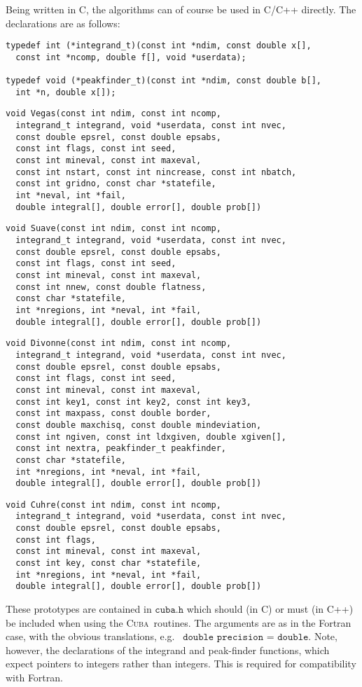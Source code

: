 \documentclass[12pt]{article}
\newcommand\cuba{\textsc{Cuba}}
\newcommand\eg{e.g.\ }
\newcommand\Code[1]{\ensuremath{\texttt{#1}}}
\begin{document}
Being written in C, the algorithms can of course be used in C/C++ 
directly.  The declarations are as follows:
\begin{verbatim}
typedef int (*integrand_t)(const int *ndim, const double x[],
  const int *ncomp, double f[], void *userdata);

typedef void (*peakfinder_t)(const int *ndim, const double b[],
  int *n, double x[]);
\end{verbatim}
\begin{verbatim}
void Vegas(const int ndim, const int ncomp,
  integrand_t integrand, void *userdata, const int nvec,
  const double epsrel, const double epsabs,
  const int flags, const int seed,
  const int mineval, const int maxeval,
  const int nstart, const int nincrease, const int nbatch,
  const int gridno, const char *statefile,
  int *neval, int *fail,
  double integral[], double error[], double prob[])
\end{verbatim}
\begin{verbatim}
void Suave(const int ndim, const int ncomp,
  integrand_t integrand, void *userdata, const int nvec,
  const double epsrel, const double epsabs,
  const int flags, const int seed,
  const int mineval, const int maxeval,
  const int nnew, const double flatness,
  const char *statefile,
  int *nregions, int *neval, int *fail,
  double integral[], double error[], double prob[])
\end{verbatim}
\begin{verbatim}
void Divonne(const int ndim, const int ncomp,
  integrand_t integrand, void *userdata, const int nvec,
  const double epsrel, const double epsabs,
  const int flags, const int seed,
  const int mineval, const int maxeval,
  const int key1, const int key2, const int key3,
  const int maxpass, const double border,
  const double maxchisq, const double mindeviation,
  const int ngiven, const int ldxgiven, double xgiven[],
  const int nextra, peakfinder_t peakfinder,
  const char *statefile,
  int *nregions, int *neval, int *fail,
  double integral[], double error[], double prob[])
\end{verbatim}
\begin{verbatim}
void Cuhre(const int ndim, const int ncomp,
  integrand_t integrand, void *userdata, const int nvec,
  const double epsrel, const double epsabs,
  const int flags,
  const int mineval, const int maxeval,
  const int key, const char *statefile,
  int *nregions, int *neval, int *fail,
  double integral[], double error[], double prob[])
\end{verbatim}
These prototypes are contained in \Code{cuba.h} which should (in C) or
must (in C++) be included when using the \cuba\ routines.  The arguments
are as in the Fortran case, with the obvious translations, \eg
\Code{double precision} = \Code{double}.  Note, however, the
declarations of the integrand and peak-finder functions, which expect
pointers to integers rather than integers.  This is required for
compatibility with Fortran.
\end{document}
